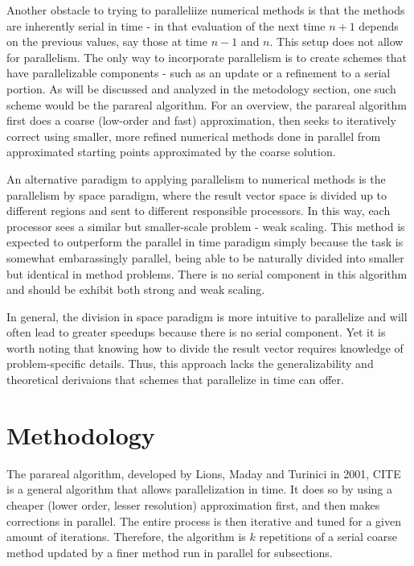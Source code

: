 \documentclass[letterpaper,twocolumn,11pt]{article}
\begin{document}
Another obstacle to trying to paralleliize numerical methods is that the methods are inherently serial in time - in that evaluation of the next time $n+1$ depends on the previous values, say those at time $n-1$ and $n$.  This setup does not allow for parallelism.  The only way to incorporate parallelism is to create schemes that have parallelizable components - such as an update or a refinement to a serial portion.  As will be discussed and analyzed in the metodology section, one such scheme would be the parareal algorithm.  For an overview, the parareal algorithm first does a coarse (low-order and fast) approximation, then seeks to iteratively correct using smaller, more refined numerical methods done in parallel from approximated starting points approximated by the coarse solution.

An alternative paradigm to applying parallelism to numerical methods is the parallelism by space paradigm, where the result vector space is divided up to different regions and sent to different responsible processors.  In this way, each processor sees a similar but smaller-scale problem - weak scaling.  This method is expected to outperform the parallel in time paradigm simply because the task is somewhat embarassingly parallel, being able to be naturally divided into smaller but identical in method problems.  There is no serial component in this algorithm and should be exhibit both strong and weak scaling.

In general, the division in space paradigm is more intuitive to parallelize and will often lead to greater speedups because there is no serial component.  Yet it is worth noting that knowing how to divide the result vector requires knowledge of problem-specific details.  Thus, this approach lacks the generalizability and theoretical derivaions that schemes that parallelize in time can offer.

\section{Methodology}

The parareal algorithm, developed by Lions, Maday and Turinici in 2001, CITE is
a general algorithm that allows parallelization in time.  It does so by using a
cheaper (lower order, lesser resolution) approximation first, and then makes
corrections in parallel. The entire process is then iterative and tuned for a
given amount of iterations. Therefore, the algorithm is $k$ repetitions of a
serial coarse method updated by a finer method run in parallel for subsections.
\end{document}
